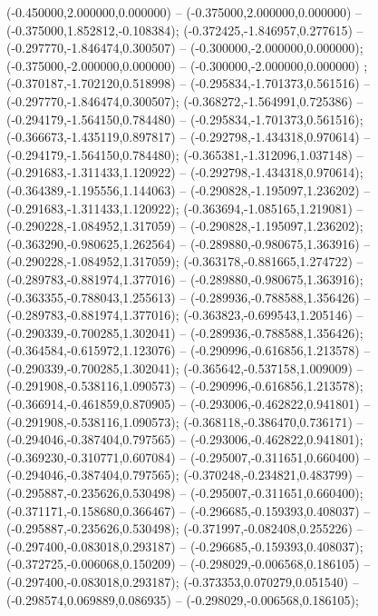  (-0.450000,2.000000,0.000000) -- (-0.375000,2.000000,0.000000) -- (-0.375000,1.852812,-0.108384);
 (-0.372425,-1.846957,0.277615) -- (-0.297770,-1.846474,0.300507) -- (-0.300000,-2.000000,0.000000);
 (-0.375000,-2.000000,0.000000) -- (-0.300000,-2.000000,0.000000) ;
 (-0.370187,-1.702120,0.518998) -- (-0.295834,-1.701373,0.561516) -- (-0.297770,-1.846474,0.300507);
 (-0.368272,-1.564991,0.725386) -- (-0.294179,-1.564150,0.784480) -- (-0.295834,-1.701373,0.561516);
 (-0.366673,-1.435119,0.897817) -- (-0.292798,-1.434318,0.970614) -- (-0.294179,-1.564150,0.784480);
 (-0.365381,-1.312096,1.037148) -- (-0.291683,-1.311433,1.120922) -- (-0.292798,-1.434318,0.970614);
 (-0.364389,-1.195556,1.144063) -- (-0.290828,-1.195097,1.236202) -- (-0.291683,-1.311433,1.120922);
 (-0.363694,-1.085165,1.219081) -- (-0.290228,-1.084952,1.317059) -- (-0.290828,-1.195097,1.236202);
 (-0.363290,-0.980625,1.262564) -- (-0.289880,-0.980675,1.363916) -- (-0.290228,-1.084952,1.317059);
 (-0.363178,-0.881665,1.274722) -- (-0.289783,-0.881974,1.377016) -- (-0.289880,-0.980675,1.363916);
 (-0.363355,-0.788043,1.255613) -- (-0.289936,-0.788588,1.356426) -- (-0.289783,-0.881974,1.377016);
 (-0.363823,-0.699543,1.205146) -- (-0.290339,-0.700285,1.302041) -- (-0.289936,-0.788588,1.356426);
 (-0.364584,-0.615972,1.123076) -- (-0.290996,-0.616856,1.213578) -- (-0.290339,-0.700285,1.302041);
 (-0.365642,-0.537158,1.009009) -- (-0.291908,-0.538116,1.090573) -- (-0.290996,-0.616856,1.213578);
 (-0.366914,-0.461859,0.870905) -- (-0.293006,-0.462822,0.941801) -- (-0.291908,-0.538116,1.090573);
 (-0.368118,-0.386470,0.736171) -- (-0.294046,-0.387404,0.797565) -- (-0.293006,-0.462822,0.941801);
 (-0.369230,-0.310771,0.607084) -- (-0.295007,-0.311651,0.660400) -- (-0.294046,-0.387404,0.797565);
 (-0.370248,-0.234821,0.483799) -- (-0.295887,-0.235626,0.530498) -- (-0.295007,-0.311651,0.660400);
 (-0.371171,-0.158680,0.366467) -- (-0.296685,-0.159393,0.408037) -- (-0.295887,-0.235626,0.530498);
 (-0.371997,-0.082408,0.255226) -- (-0.297400,-0.083018,0.293187) -- (-0.296685,-0.159393,0.408037);
 (-0.372725,-0.006068,0.150209) -- (-0.298029,-0.006568,0.186105) -- (-0.297400,-0.083018,0.293187);
 (-0.373353,0.070279,0.051540) -- (-0.298574,0.069889,0.086935) -- (-0.298029,-0.006568,0.186105);
